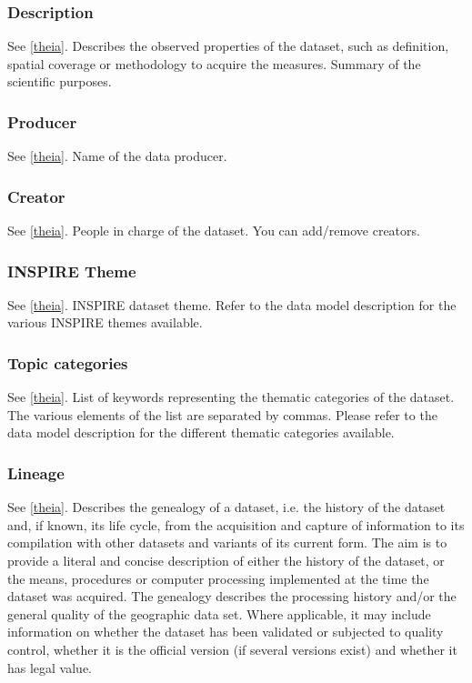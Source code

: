 \subsubsection{Description}
See \ref{theia}. Describes the observed properties of the dataset, such as definition, spatial coverage or methodology to acquire the measures. Summary of the scientific purposes.

\subsubsection{Producer}
See \ref{theia}. Name of the data producer.

\subsubsection{Creator}
See \ref{theia}. People in charge of the dataset. You can add/remove creators.

\subsubsection{INSPIRE Theme}
See \ref{theia}. INSPIRE dataset theme. Refer to the data model description for the various INSPIRE themes available.

\subsubsection{Topic categories}
See \ref{theia}. List of keywords representing the thematic categories of the dataset. The various elements of the list are separated by commas. Please refer to the data model description for the different thematic categories available.

\subsubsection{Lineage}
See \ref{theia}. Describes the genealogy of a dataset, i.e. the history of the dataset and, if known, its life cycle, from the acquisition and capture of information to its compilation with other datasets and variants of its current form. The aim is to provide a literal and concise description of either the history of the dataset, or the means, procedures or computer processing implemented at the time the dataset was acquired. The genealogy describes the processing history and/or the general quality of the geographic data set. Where applicable, it may include information on whether the dataset has been validated or subjected to quality control, whether it is the official version (if several versions exist) and whether it has legal value.

